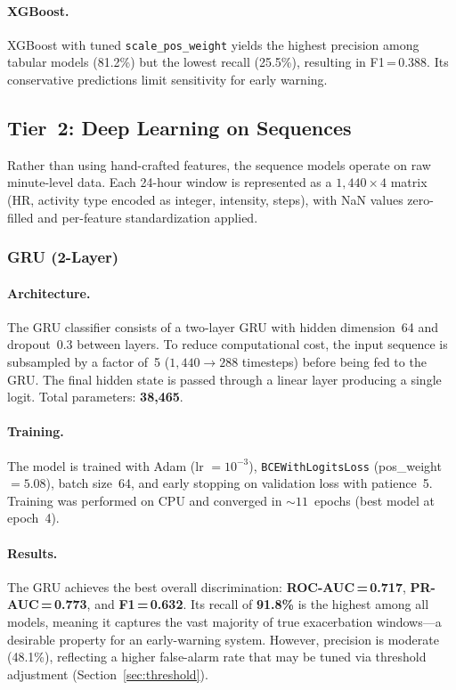 \documentclass[11pt,a4paper]{article}
\begin{document}
\paragraph{XGBoost.}
XGBoost with tuned \texttt{scale\_pos\_weight} yields the highest precision
among tabular models (81.2\%) but the lowest recall (25.5\%), resulting in
F1\,=\,0.388.  Its conservative predictions limit sensitivity for early
warning.

\subsection{Tier~2: Deep Learning on Sequences}\label{sec:deep}

Rather than using hand-crafted features, the sequence models operate on raw
minute-level data.  Each 24-hour window is represented as a
$1{,}440 \times 4$ matrix (HR, activity type encoded as integer, intensity,
steps), with NaN values zero-filled and per-feature standardization applied.

\subsubsection{GRU (2-Layer)}\label{sec:gru}

\paragraph{Architecture.}
The GRU classifier consists of a two-layer GRU with hidden dimension~64 and
dropout~0.3 between layers.  To reduce computational cost, the input sequence
is subsampled by a factor of~5 ($1{,}440 \to 288$ timesteps) before being fed
to the GRU.  The final hidden state is passed through a linear layer producing
a single logit.  Total parameters: \textbf{38{,}465}.

\paragraph{Training.}
The model is trained with Adam (lr $= 10^{-3}$), \texttt{BCEWithLogitsLoss}
(pos\_weight~$= 5.08$), batch size~64, and early stopping on validation loss
with patience~5.  Training was performed on CPU and converged in
${\sim}11$~epochs (best model at epoch~4).

\paragraph{Results.}
The GRU achieves the best overall discrimination: \textbf{ROC-AUC\,=\,0.717},
\textbf{PR-AUC\,=\,0.773}, and \textbf{F1\,=\,0.632}.  Its recall of
\textbf{91.8\%} is the highest among all models, meaning it captures the vast
majority of true exacerbation windows—a desirable property for an early-warning
system.  However, precision is moderate (48.1\%), reflecting a higher
false-alarm rate that may be tuned via threshold adjustment
(Section~\ref{sec:threshold}).
\end{document}
